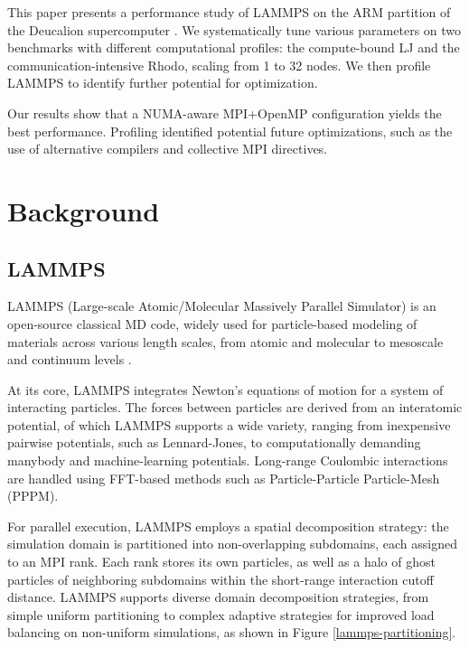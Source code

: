 \documentclass[sigplan, nonacm, screen]{acmart}
\begin{document}
This paper presents a performance study of LAMMPS on the ARM partition of the Deucalion
supercomputer \cite{deucalion}. We systematically tune various parameters on two benchmarks with
different computational profiles: the compute-bound LJ and the communication-intensive Rhodo,
scaling from 1 to 32 nodes. We then profile LAMMPS to identify further potential for optimization.

Our results show that a NUMA-aware MPI+OpenMP configuration yields the best performance. Profiling
identified potential future optimizations, such as the use of alternative compilers and collective
MPI directives.

\section{Background} %
\label{background}

\subsection{LAMMPS} %
\label{lammps}

LAMMPS (Large-scale Atomic/Molecular Massively Parallel Simulator) is an open-source classical MD
code, widely used for particle-based modeling of materials across various length scales, from atomic
and molecular to mesoscale and continuum levels \cite{lammps}.

At its core, LAMMPS integrates Newton's equations of motion for a system of interacting particles.
The forces between particles are derived from an interatomic potential, of which LAMMPS
supports a wide variety, ranging from inexpensive pairwise potentials, such as Lennard-Jones, to
computationally demanding manybody and machine-learning potentials. Long-range Coulombic
interactions are handled using FFT-based methods such as Particle-Particle Particle-Mesh (PPPM).

For parallel execution, LAMMPS employs a spatial decomposition strategy: the simulation domain is
partitioned into non-overlapping subdomains, each assigned to an MPI rank. Each rank stores its
own particles, as well as a halo of ghost particles of neighboring subdomains within the short-range
interaction cutoff distance. LAMMPS supports diverse domain decomposition strategies, from simple
uniform partitioning to complex adaptive strategies for improved load balancing on non-uniform
simulations, as shown in Figure \ref{lammps-partitioning}.
\end{document}
